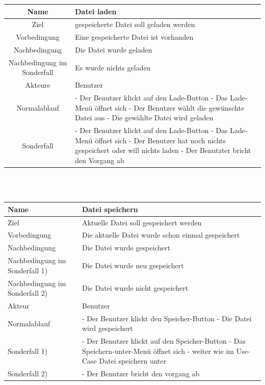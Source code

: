 \documentclass[a4paper,10pt]{scrartcl}
\begin{document}
\begin{tabular}{|c|p{10cm}|}
\hline Name & \textbf{Datei laden} \\ 
\hline Ziel & gespeicherte Datei soll geladen werden \\ 
\hline Vorbedingung & Eine gespeicherte Datei ist vorhanden \\ 
\hline Nachbedingung & Die Datei wurde geladen \\ 
\hline Nachbedingung im Sonderfall & Es wurde nichts geladen \\ 
\hline Akteure & Benutzer \\ 
\hline Normalablauf & - Der Benutzer klickt auf den Lade-Button
\newline 
- Das Lade-Menü öffnet sich
\newline 
- Der Benutzer wählt die gewünschte Datei aus
\newline 
- Die gewählte Datei wird geladen
\\ 
\hline Sonderfall &  
 - Der Benutzer klickt auf den Lade-Button
 \newline
 - Das Lade-Menü öffnet sich
 \newline
 - Der Benutzer hat noch nichts gespeichert oder will nichts laden
 \newline
 - Der Benutzter bricht den Vorgang ab
\\
\hline 
\end{tabular} 
\\
\\
\begin{tabular}{|p{5cm}|p{10cm}|}
\hline Name & \textbf{Datei speichern} \\ 
\hline Ziel & Aktuelle Datei soll gespeichert werden \\ 
\hline Vorbedingung & Die aktuelle Datei wurde schon einmal gespeichert \\ 
\hline Nachbedingung & Die Datei wurde gespeichert \\ 
\hline Nachbedingung im Sonderfall 1) & Die Datei wurde neu gespeichert \\ 
\hline Nachbedingung im Sonderfall 2) & Die Datei wurde nicht gespeichert\\
\hline Akteur & Benutzer \\ 
\hline Normalablauf & - Der Benutzer klickt den Speicher-Button 
\newline
- Die Datei wird gespeichert
\\
\hline Sonderfall 1) & - Der Benutzer klickt auf den Speicher-Button
\newline
- Das Speichern-unter-Menü öffnet sich
\newline
- weiter wie im Use-Case Datei speichern unter
 \\ 
 \hline Sonderfall 2) & - Der Benutzer bricht den vorgang ab \\
\hline 
\end{tabular} 
\end{document}
